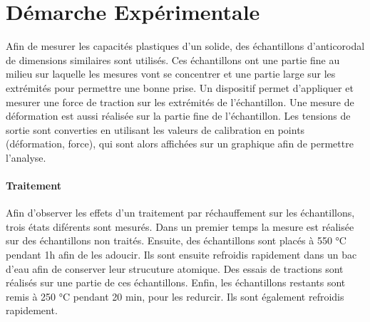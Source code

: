\section{Démarche Expérimentale}

Afin de mesurer les capacités plastiques d'un solide, des échantillons d'anticorodal de dimensions similaires sont utilisés. Ces échantillons ont une partie fine au milieu sur laquelle les mesures vont se concentrer et une partie large sur les extrémités pour permettre une bonne prise. Un dispositif permet d'appliquer et mesurer une force de traction sur les extrémités de l'échantillon. Une mesure de déformation est aussi réalisée sur la partie fine de l'échantillon. Les tensions de sortie sont converties en utilisant les valeurs de calibration en points (déformation, force), qui sont alors affichées sur un graphique afin de permettre l'analyse.

\paragraph{Traitement} Afin d'observer les effets d'un traitement par réchauffement sur les échantillons, trois états diférents sont mesurés. Dans un premier temps la mesure est réalisée sur des échantillons non traités. Ensuite, des échantillons sont placés à 550 \si{\celsius} pendant 1h afin de les adoucir. Ils sont ensuite refroidis rapidement dans un bac d'eau afin de conserver leur strucuture atomique. Des essais de tractions sont réalisés sur une partie de ces échantillons. Enfin, les échantillons restants sont remis à 250 \si{\celsius} pendant 20 min, pour les redurcir. Ils sont également refroidis rapidement.